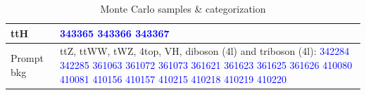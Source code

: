 \documentclass[11pt]{article}
\begin{document}
	\begin{table}[htp]
		\caption{Monte Carlo samples \& categorization}
		\begin{center}
			\begin{tabular}{|l|p{10cm}|}
			\hline
			ttH & \textcolor{blue}{343365} \textcolor{blue}{343366} \textcolor{blue}{343367} \\
			\hline
			Prompt bkg & ttZ, ttWW, tWZ, 4top, VH, diboson (4l) and triboson (4l): \textcolor{blue}{342284} \textcolor{blue}{342285} \textcolor{blue}{361063} \textcolor{blue}{361072} \textcolor{blue}{361073} \textcolor{blue}{361621} \textcolor{blue}{361623} \textcolor{blue}{361625} \textcolor{blue}{361626} \textcolor{blue}{410080} \textcolor{blue}{410081} \textcolor{blue}{410156} \textcolor{blue}{410157} \textcolor{blue}{410215} \textcolor{blue}{410218} \textcolor{blue}{410219} \textcolor{blue}{410220} \\
			\hline

\end{tabular}
\end{center}
\end{table}
\end{document}
